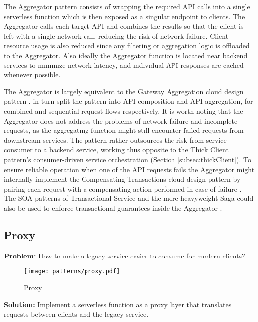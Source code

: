 The Aggregator pattern consists of wrapping the required API calls into a single serverless function which is then exposed as a singular endpoint to clients. The Aggregator calls each target API and combines the results so that the client is left with a single network call, reducing the risk of network failure. Client resource usage is also reduced since any filtering or aggregation logic is offloaded to the Aggregator. Also ideally the Aggregator function is located near backend services to minimize network latency, and individual API responses are cached whenever possible. \parencite{baldini17currentTrends}

The Aggregator is largely equivalent to the Gateway Aggregation cloud design pattern \parencite{microsoft18cloudPatterns}. \textcite{baldini17currentTrends} in turn split the pattern into API composition and API aggregation, for combined and sequential request flows respectively. It is worth noting that the Aggregator does not address the problems of network failure and incomplete requests, as the aggregating function might still encounter failed requests from downstream services. The pattern rather outsources the risk from service consumer to a backend service, working thus opposite to the Thick Client pattern's consumer-driven service orchestration (Section \ref{subsec:thickClient}). To ensure reliable operation when one of the API requests fails the Aggregator might internally implement the Compensating Transactions cloud design pattern by pairing each request with a compensating action performed in case of failure \parencite{microsoft18cloudPatterns}. The SOA patterns of Transactional Service and the more heavyweight Saga could also be used to enforce transactional guarantees inside the Aggregator \parencite{rotem12soa}.

\subsection{Proxy} \label{subsec:proxy}

\textbf{Problem:} How to make a legacy service easier to consume for modern clients?

\begin{figure}[h]
  \centering
  \texttt{[image: patterns/proxy.pdf]}
  \caption{Proxy}
  \label{fig:proxy}
\end{figure}

\textbf{Solution:} Implement a serverless function as a proxy layer that translates requests between clients and the legacy service.

